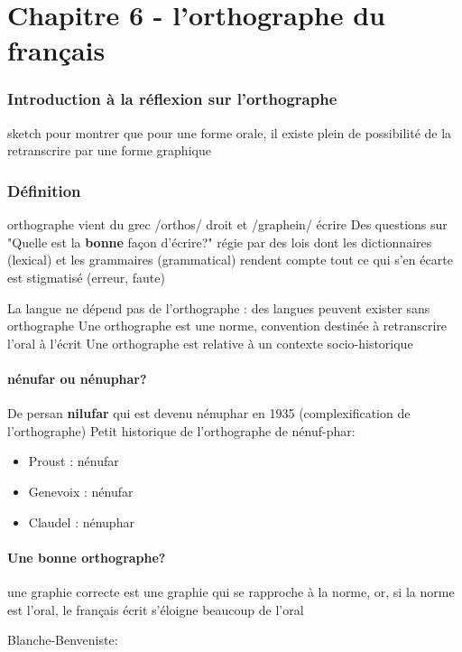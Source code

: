 \part{Chapitre 6 - l'orthographe du français}
\section*{Introduction à la réflexion sur l'orthographe}
sketch pour montrer que pour une forme orale, il existe plein de possibilité de la retranscrire par une forme graphique
\section{Définition}
orthographe vient du grec /orthos/ droit et /graphein/ écrire
Des questions sur "Quelle est la \textbf{bonne} façon d'écrire?"
   régie par des lois dont les dictionnaires (lexical) et les grammaires (grammatical) rendent compte
   tout ce qui s'en écarte est stigmatisé (erreur, faute)

La langue ne dépend pas de l'orthographe : des langues peuvent exister sans orthographe
Une orthographe est une norme, convention destinée à retranscrire l'oral à l'écrit
Une orthographe est relative à un contexte socio-historique
\subsection{nénufar ou nénuphar?}
De persan \textbf{nilufar} qui est devenu nénuphar en 1935 (complexification de l'orthographe)
Petit historique de l'orthographe de nénuf-phar:
\begin{itemize}
   \item Proust : nénufar
   \item Genevoix : nénufar
   \item Claudel : nénuphar
\end{itemize}

\subsection{Une bonne orthographe?}
une graphie correcte est une graphie qui se rapproche à la norme, 
    or, si la norme est l'oral, le français écrit s'éloigne beaucoup de l'oral

Blanche-Benveniste:


